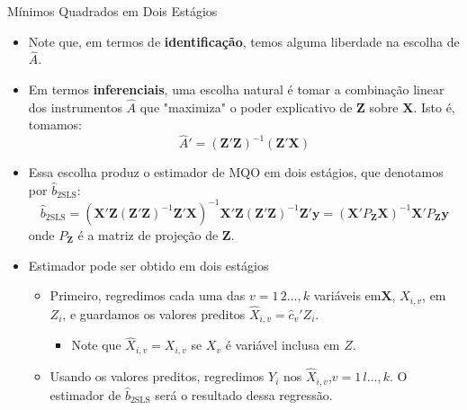 \documentclass[11pt]{beamer}
\begin{document}
\begin{frame}{Mínimos Quadrados em Dois Estágios}
\begin{itemize}
	\item Note que, em termos de \textbf{identificação}, temos alguma liberdade na escolha de $\hat{A}$.
	\item Em termos \textbf{inferenciais}, uma escolha natural é tomar a combinação linear dos instrumentos $\hat{A}$ que "maximiza" o poder explicativo de $\boldsymbol{Z}$ sobre $\boldsymbol{X}$. Isto é, tomamos:
	$$\hat{A}' = (\boldsymbol{Z}'\boldsymbol{Z})^{-1}(\boldsymbol{Z}'\boldsymbol{X}) $$
	\item Essa escolha produz o estimador de {\color{blue}MQO em dois estágios}, que denotamos por $\hat{b}_{\text{2SLS}}$:
	\begin{equation*}
		\hat{b}_{\text{2SLS}} = (\boldsymbol{X}'\boldsymbol{Z}(\boldsymbol{Z}'\boldsymbol{Z})^{-1}\boldsymbol{Z}'\boldsymbol{X})^{-1} \boldsymbol{X}'\boldsymbol{Z}(\boldsymbol{Z}'\boldsymbol{Z})^{-1} \boldsymbol{Z}'\boldsymbol{y} = \left(\boldsymbol{X}'P_{\boldsymbol{Z}}\boldsymbol{X}\right)^{-1}\boldsymbol{X}'P_{\boldsymbol{Z}}\boldsymbol{y} 
	\end{equation*}
	onde $P_{\boldsymbol{Z}}$ é a matriz de projeção de $\boldsymbol{Z}$.
	\item Estimador pode ser obtido em dois estágios
	\begin{itemize}
		\item Primeiro, regredimos cada uma das $v=1\,2\dots,k$ variáveis em$\boldsymbol{X}$, $X_{i,v}$, em $Z_i$, e guardamos os valores preditos $\hat{X}_{i,v} = \hat{c}_{v}'Z_i$.
		\begin{itemize}
			\item Note que $\hat{X}_{i,v} = X_{i,v} $ se $X_{v}$ é variável inclusa em $Z$. 
		\end{itemize}
		\item Usando os valores preditos, regredimos $Y_i$ nos $\hat{X}_{i,v}$,$v=1\,l\dots,k$.  O estimador de $\hat{b}_{\text{2SLS}}$ será o resultado dessa regressão.
	\end{itemize}
\end{itemize}
\end{frame}
\end{document}
